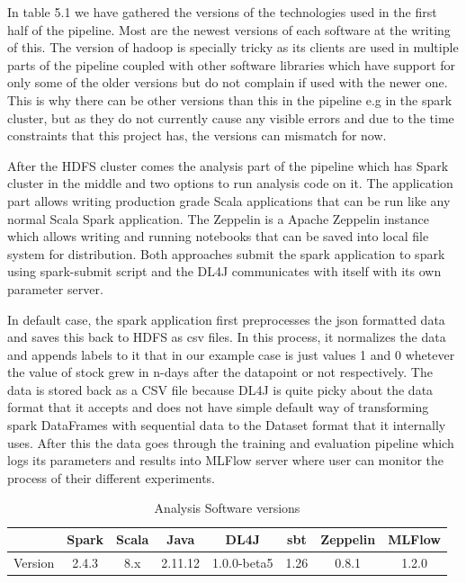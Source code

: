 In table 5.1 we have gathered the versions of the technologies used in the first half of the pipeline.
Most are the newest versions of each software at the writing of this.
The version of hadoop is specially tricky as its clients are used in multiple parts of the pipeline coupled with other software libraries which have support for only some of the older versions but do not complain if used with the newer one.
This is why there can be other versions than this in the pipeline e.g in the spark cluster, but as they do not currently cause any visible errors and due to the time constraints that this project has, the versions can mismatch for now.

After the HDFS cluster comes the analysis part of the pipeline which has Spark cluster in the middle and two options to run analysis code on it.
The application part allows writing production grade Scala applications that can be run like any normal Scala Spark application.
The Zeppelin is a Apache Zeppelin instance which allows writing and running notebooks that can be saved into local file system for distribution.
Both approaches submit the spark application to spark using spark-submit script and the DL4J communicates with itself with its own parameter server.

In default case, the spark application first preprocesses the json formatted data and saves this back to HDFS as csv files.
In this process, it normalizes the data and appends labels to it that in our example case is just values 1 and 0 whetever the value of stock grew in n-days after the datapoint or not respectively.
The data is stored back as a CSV file because DL4J is quite picky about the data format that it accepts and does not have simple default way of transforming spark DataFrames with sequential data to the Dataset format that it internally uses.
After this the data goes through the training and evaluation pipeline which logs its parameters and results into MLFlow server where user can monitor the process of their different experiments.

\begin{table}[! htbp]\centering
    \caption{Analysis Software versions}
    \begin{threeparttable}
        \begin{tabular}{|c|c|c|c|c|c|c|c|} 
        \hline
        & Spark & Scala & Java & DL4J & sbt & Zeppelin & MLFlow \\ \hline
        Version & 2.4.3 & 8.x & 2.11.12 & 1.0.0-beta5 & 1.26 & 0.8.1 & 1.2.0\\
        \hline
        \end{tabular}
    \end{threeparttable}
\end{table}

